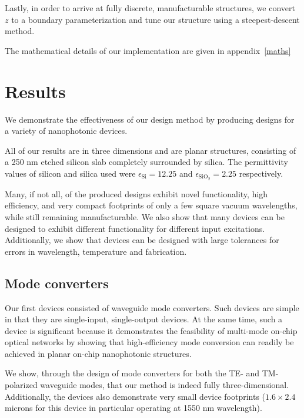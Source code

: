 Lastly, in order to arrive at fully discrete, manufacturable structures,
    we convert $z$ to a boundary parameterization\cite{Osher02}
    and tune our structure using a steepest-descent method.

The mathematical details of our implementation are given 
    in appendix~\ref{maths}

\section{Results}
We demonstrate the effectiveness of our design method 
    by producing designs for a variety of nanophotonic devices\cite{Lu13}.

All of our results are in three dimensions
    and are planar structures, consisting of a 250 nm etched silicon slab
    completely surrounded by silica.
The permittivity values of silicon and silica used
    were $\epsilon_\text{Si} = 12.25$ and $\epsilon_\text{SiO$_2$} = 2.25$
    respectively.

Many, if not all, of the produced designs exhibit 
    novel functionality, high efficiency, and 
    very compact footprints of only a few square vacuum wavelengths,
    while still remaining manufacturable.
We also show that many devices can be designed
    to exhibit different functionality for different input excitations.
Additionally, we show that devices can be designed with large tolerances for
    errors in wavelength, temperature and fabrication.

\subsection{Mode converters}

Our first devices consisted of waveguide mode converters.
Such devices are simple in that they are single-input, single-output devices.
At the same time, such a device is significant because 
    it demonstrates the feasibility of multi-mode on-chip optical networks
    by showing that high-efficiency mode conversion 
    can readily be achieved in planar on-chip nanophotonic structures.

We show, through the design of mode converters for both the TE- and TM-polarized
    waveguide modes, 
    that our method is indeed fully three-dimensional.
Additionally, the devices also demonstrate very small device footprints 
    ($1.6 \times 2.4$ microns for this device in particular
    operating at 1550 nm wavelength).

